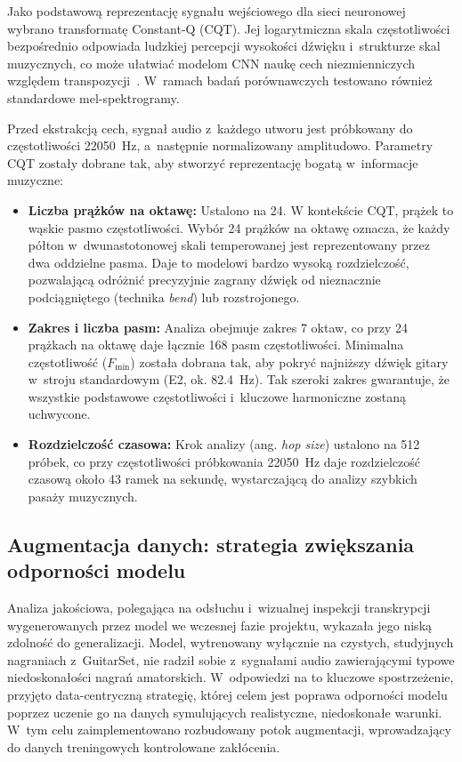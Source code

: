 Jako podstawową reprezentację sygnału wejściowego dla sieci neuronowej wybrano transformatę Constant-Q (CQT). Jej logarytmiczna skala częstotliwości bezpośrednio odpowiada ludzkiej percepcji wysokości dźwięku i~strukturze skal muzycznych, co może ułatwiać modelom CNN naukę cech niezmienniczych względem transpozycji~\autocite{Wiggins2019TabCNN, KlapuriDavy2006SignalProcessing, Benetos2019AutomaticMusicTranscription}. W~ramach badań porównawczych testowano również standardowe mel-spektrogramy.

Przed ekstrakcją cech, sygnał audio z~każdego utworu jest próbkowany do częstotliwości 22050~Hz, a~następnie normalizowany amplitudowo. Parametry CQT zostały dobrane tak, aby stworzyć reprezentację bogatą w~informacje muzyczne:
\begin{itemize}
    \item \textbf{Liczba prążków na oktawę:} Ustalono na 24. W kontekście CQT, prążek to wąskie pasmo częstotliwości. Wybór 24 prążków na oktawę oznacza, że każdy półton w~dwunastotonowej skali temperowanej jest reprezentowany przez dwa oddzielne pasma. Daje to modelowi bardzo wysoką rozdzielczość, pozwalającą odróżnić precyzyjnie zagrany dźwięk od nieznacznie podciągniętego (technika \textit{bend}) lub rozstrojonego.
    \item \textbf{Zakres i liczba pasm:} Analiza obejmuje zakres 7 oktaw, co przy 24 prążkach na oktawę daje łącznie 168 pasm częstotliwości. Minimalna częstotliwość ($F_{\text{min}}$) została dobrana tak, aby pokryć najniższy dźwięk gitary w~stroju standardowym (E2, ok. 82.4~Hz). Tak szeroki zakres gwarantuje, że wszystkie podstawowe częstotliwości i~kluczowe harmoniczne zostaną uchwycone.
    \item \textbf{Rozdzielczość czasowa:} Krok analizy (ang. \textit{hop size}) ustalono na 512 próbek, co przy częstotliwości próbkowania 22050~Hz daje rozdzielczość czasową około 43 ramek na sekundę, wystarczającą do analizy szybkich pasaży muzycznych.
\end{itemize}

\subsection{Augmentacja danych: strategia zwiększania odporności modelu}
\label{ssec:augmentacja_danych}

Analiza jakościowa, polegająca na odsłuchu i~wizualnej inspekcji transkrypcji wygenerowanych przez model we wczesnej fazie projektu, wykazała jego niską zdolność do generalizacji. Model, wytrenowany wyłącznie na czystych, studyjnych nagraniach z~GuitarSet, nie radził sobie z~sygnałami audio zawierającymi typowe niedoskonałości nagrań amatorskich. W~odpowiedzi na to kluczowe spostrzeżenie, przyjęto data-centryczną strategię, której celem jest poprawa odporności modelu poprzez uczenie go na danych symulujących realistyczne, niedoskonałe warunki. W~tym celu zaimplementowano rozbudowany potok augmentacji, wprowadzający do danych treningowych kontrolowane zakłócenia.

